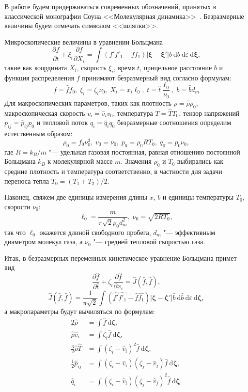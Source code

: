 \documentclass[a4paper,12pt]{article}
\newcommand{\dd}{\:\mathrm{d}}
\begin{document}
В работе будем придерживаться современных обозначений, принятых 
в классической монографии Соуна <<Молекулярная динамика>>~\cite{Sone2007}.
Безразмерные величины будем отмечать символом <<шляпки>>.

Микроскопические величины в уравнении Больцмана
\[
	\frac{\partial{f}}{\partial{t}} + \xi_i\frac{\partial{f}}{\partial X_i} = 
	\int (f'f'_1-ff_1)|\boldsymbol{\xi}-\boldsymbol{\xi}'|b\dd b \dd \varepsilon \boldsymbol{\dd\xi},
\]
такие как координата \(X_i\), скорость \(\xi_i\), время \(t\), прицельное расстояние \(b\)
и функция распределения \(f\) принимают безразмерный вид согласно формулам:
\[ f = \hat{f}f_0,\; \xi_i = \zeta_i\nu_0,\; X_i = x_i\ell_0,\;
	t = \hat{t}\frac{\ell_0}{\nu_0},\; b = \hat{b}d_m \]
Для макроскопических параметров, таких как плотность \( \rho = \hat{\rho}\rho_0\), макроскопическая скорость \(v_i = \hat{v}_iv_0\),
температура \(T = \hat{T}T_0\), тензор напряжений \(p_{ij} = \hat{p}_{ij}p_0\) и тепловой поток \(q_i = \hat{q}_iq_0\) 
безразмерные соотношения определим естественным образом:
\[ \rho_0 = f_0 \nu_0^3, \; v_0 = \nu_0, \; p_0 = \rho_0RT_0, \; q_0 = p_0\nu_0, \]
где \(R = k_B/m\) "--- удельная газовая постоянная, равная отношению постоянной Больцмана \(k_B\) к молекулярной массе \(m\).
Значения \(\rho_0\) и \(T_0\) выбирались как средние плотность и температура соответственно,
в частности для задачи переноса тепла \(T_0 = (T_1+T_2)/2\).

Наконец, свяжем две единицы измерения длины \(x\), \(b\) и единицы температуры \(T_0\), скорости \(\nu_0\):
\[ \ell_0 = \frac{m}{\pi\sqrt2 \rho_0 d_m^2}, \; \nu_0 = \sqrt{2RT_0}, \]
так что \(\ell_0\) окажется длиной свободного пробега, \(d_m\) "--- эффективным диаметром молекул газа,
а \(\nu_0\) "--- средней тепловой скоростью газа.

Итак, в безразмерных переменных кинетическое уравнение Больцмана примет вид
\[ \frac{\partial\hat{f}}{\partial\hat{t}} + \zeta_i\frac{\partial\hat{f}}{\partial x_i} = \hat{J}(\hat{f},\hat{f}), \]
\[ 
	\hat{J}(\hat{f},\hat{f}) = \frac1{\pi\sqrt2}\int (\hat{f'}\hat{f'_1}-\hat{f}\hat{f_1})
	|\boldsymbol{\zeta}-\boldsymbol{\zeta}'| \hat{b}\dd \hat{b} \dd \varepsilon \boldsymbol{\dd\zeta},
\]
а макропараметры будут вычиляться по формулам:
\begin{alignat*}{2}
	\hat{\rho} &= \int \hat{f}\boldsymbol{\dd\zeta}, \\
	\hat{\rho}\hat{v}_i &= \int \zeta_i \hat{f}\boldsymbol{\dd\zeta}, \\
	\frac3{2}\hat{\rho}\hat{T} &= \int(\zeta_i-\hat{v}_i)^2\hat{f}\boldsymbol{\dd\zeta}, \\
	\frac1{2}\hat{p}_{ij} &= \int(\zeta_i-\hat{v}_i)(\zeta_j-\hat{v}_j)\hat{f}\boldsymbol{\dd\zeta}, \\
	\hat{q}_i &= \int(\zeta_i-\hat{v}_i)(\zeta_j-\hat{v}_j)^2\hat{f}\boldsymbol{\dd\zeta}.
\end{alignat*}
\end{document}

